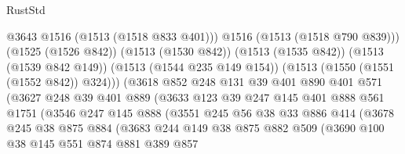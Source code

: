 \begin{lexlean}{RustStd}
\begin{coremodule}
{\begin{coremodule}
{{{{{{{{                              @3643
                              @1516
                              (@1513 (@1518 @833 @401)))
                            @1516
                            (@1513 (@1518 @790 @839)))
                          (@1525 (@1526 @842))
                          (@1513 (@1530 @842))
                          (@1513 (@1535 @842))
                          (@1513 (@1539 @842 @149))
                          (@1513 (@1544 @235 @149 @154))
                          (@1513 (@1550 (@1551 (@1552 @842)) @324)))
                        (@3618
                          @852
                          @248
                          @131
                          @39
                          @401
                          @890
                          @401
                          @571
                          (@3627
                            @248
                            @39
                            @401
                            @889
                            (@3633
                              @123
                              @39
                              @247
                              @145
                              @401
                              @888
                              @561
                              @1751
                              (@3546
                                @247
                                @145
                                @888
                                (@3551
                                  @245
                                  @56
                                  @38
                                  @33
                                  @886
                                  @414
                                  (@3678
                                    @245
                                    @38
                                    @875
                                    @884
                                    (@3683
                                      @244
                                      @149
                                      @38
                                      @875
                                      @882
                                      @509
                                      (@3690
                                        @100
                                        @38
                                        @145
                                        @551
                                        @874
                                        @881
                                        @389
                                        @857
}}}}}}}}
\end{coremodule}}
\end{coremodule}
\end{lexlean}
